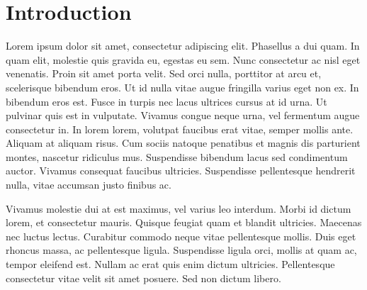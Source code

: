 \section{Introduction}
	Lorem ipsum dolor sit amet, consectetur adipiscing elit. Phasellus a dui quam. In quam elit, molestie quis gravida eu, egestas eu sem. Nunc consectetur ac nisl eget venenatis. Proin sit amet porta velit. Sed orci nulla, porttitor at arcu et, scelerisque bibendum eros. Ut id nulla vitae augue fringilla varius eget non ex. In bibendum eros est. Fusce in turpis nec lacus ultrices cursus at id urna. Ut pulvinar quis est in vulputate. Vivamus congue neque urna, vel fermentum augue consectetur in. In lorem lorem, volutpat faucibus erat vitae, semper mollis ante. Aliquam at aliquam risus. Cum sociis natoque penatibus et magnis dis parturient montes, nascetur ridiculus mus. Suspendisse bibendum lacus sed condimentum auctor. Vivamus consequat faucibus ultricies. Suspendisse pellentesque hendrerit nulla, vitae accumsan justo finibus ac.

	Vivamus molestie dui at est maximus, vel varius leo interdum. Morbi id dictum lorem, et consectetur mauris. Quisque feugiat quam et blandit ultricies. Maecenas nec luctus lectus. Curabitur commodo neque vitae pellentesque mollis. Duis eget rhoncus massa, ac pellentesque ligula. Suspendisse ligula orci, mollis at quam ac, tempor eleifend est. Nullam ac erat quis enim dictum ultricies. Pellentesque consectetur vitae velit sit amet posuere. Sed non dictum libero.























